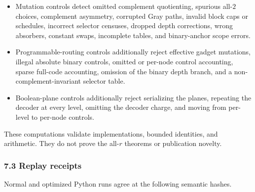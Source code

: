 \documentclass[
  11pt,
]{article}
\theoremstyle{definition}
\theoremstyle{remark}
\begin{document}
\begin{itemize}
  The independent compiler-bridge reconstruction imports no author
  implementation. It checks 3,279 anchor rows, 597,870 target/physical
  vector identities, 4,632 concrete router cases, all 128 compatible
  arity-two selectors plus four deterministic arity-three selectors
  through both branches and the glue, and every exact integer ledger
  from arity 64 through 16,384. Normal and optimized outputs are
  byte-identical. Its written induction and inequalities, not that
  bounded sweep alone, support Theorem 6.10.
\item
  Mutation controls detect omitted complement quotienting, spurious
  all-\(2\) choices, complement asymmetry, corrupted Gray paths, invalid
  block caps or schedules, incorrect selector censuses, dropped depth
  corrections, wrong absorbers, constant swaps, incomplete tables, and
  binary-anchor scope errors.
\item
  Programmable-routing controls additionally reject effective gadget
  mutations, illegal absolute binary controls, omitted or per-node
  control accounting, sparse full-code accounting, omission of the
  binary depth branch, and a non-complement-invariant selector table.
\item
  Boolean-plane controls additionally reject serializing the planes,
  repeating the decoder at every level, omitting the decoder charge, and
  moving from per-level to per-node controls.
\end{itemize}

These computations validate implementations, bounded identities, and
arithmetic. They do not prove the all-\(r\) theorems or publication
novelty.

\hypertarget{replay-receipts}{%
\subsubsection{7.3 Replay receipts}\label{replay-receipts}}

Normal and optimized Python runs agree at the following semantic hashes.
\end{document}
